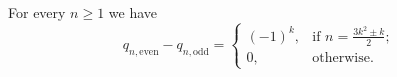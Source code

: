 

\setcounter{section}{3}
\setcounter{subsection}{8}
\setcounter{dfn}{22}

\begin{lem}
For every $n \ge 1$ we have
\[
q_{n,\mathrm{even}} - q_{n, \mathrm{odd}} =
\begin{cases}
(-1)^k, &\text{if } n = \frac{3k^2 \pm k}2;\\
0, &\text{otherwise.}
\end{cases}
\]
\end{lem}

